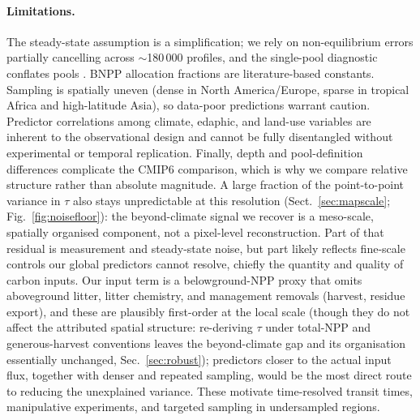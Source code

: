 \documentclass[12pt, a4paper]{article}
\begin{document}
\paragraph{Limitations.}
The steady-state assumption is a simplification; we rely on non-equilibrium errors
partially cancelling across $\sim$180\,000 profiles, and the single-pool diagnostic
conflates pools \citep{Sierra2018}. BNPP allocation fractions are literature-based
constants. Sampling is spatially uneven (dense in North America/Europe, sparse in
tropical Africa and high-latitude Asia), so data-poor predictions warrant caution.
Predictor correlations among climate, edaphic, and land-use variables are inherent to
the observational design and cannot be fully disentangled without experimental or
temporal replication. Finally, depth and pool-definition differences complicate the
CMIP6 comparison, which is why we compare relative structure rather than absolute
magnitude. A large fraction of the point-to-point variance in $\tau$ also stays
unpredictable at this resolution (Sect.~\ref{sec:mapscale}; Fig.~\ref{fig:noisefloor}):
the beyond-climate signal we recover is a meso-scale, spatially organised component,
not a pixel-level reconstruction. Part of that residual is measurement and
steady-state noise, but part likely reflects fine-scale controls our global
predictors cannot resolve, chiefly the quantity and quality of carbon inputs.
Our input term is a belowground-NPP proxy that omits aboveground litter, litter
chemistry, and management removals (harvest, residue export), and these are plausibly
first-order at the local scale (though they do not affect the attributed spatial
structure: re-deriving $\tau$ under total-NPP and generous-harvest conventions leaves
the beyond-climate gap and its organisation essentially unchanged, Sec.~\ref{sec:robust});
predictors closer to the actual input flux, together
with denser and repeated sampling, would be the most direct route to reducing the
unexplained variance. These motivate time-resolved transit times, manipulative
experiments, and targeted sampling in undersampled regions.
\end{document}
